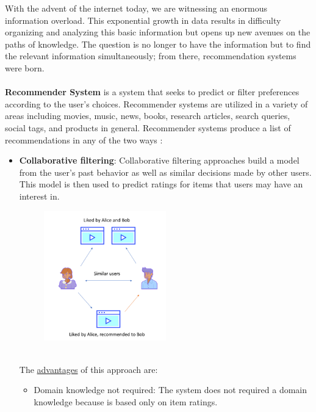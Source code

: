 \documentclass{article}
\begin{document}
With the advent of the internet today, we are witnessing an
enormous information overload. This exponential growth in
data results in difficulty organizing and analyzing this basic
information but opens up new avenues on the paths of
knowledge. The question is no longer to have the information
but to find the relevant information simultaneously; from there,
recommendation systems were born.\\ \\
\textbf{Recommender System} is a system that seeks to predict or filter preferences according to the user’s choices. Recommender systems are utilized in a variety of areas including movies, music, news, books, research articles, search queries, social tags, and products in general. 
Recommender systems produce a list of recommendations in any of the two ways :
\begin{itemize}
      \item \textbf{Collaborative filtering}: Collaborative filtering approaches build a model from the user’s past behavior as well as similar decisions made by other users. This model is then used to predict ratings for items that users may have an interest in.\\
      \begin{figure}[h]
            \begin{center}
                  \includegraphics[width=0.5\textwidth]{images/Collaborative filtering.png}
            \end{center}
      \end{figure}\\
      The \underline{advantages} of this approach are:
      \begin{itemize}
            \item Domain knowledge not required: The system does not required a domain knowledge because is based only on item ratings.

\end{itemize}
\end{itemize}
\end{document}
